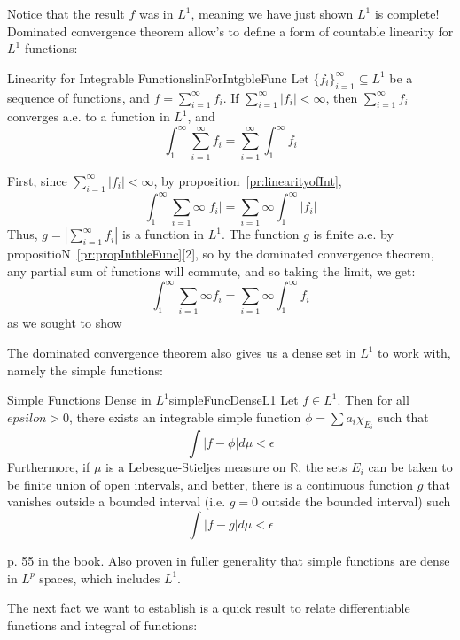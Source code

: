 \documentclass[oneside]{book}
\newcommand{\R}{\mathbb{R}}
\newcommand{\sse}{\subseteq}
\begin{document}
Notice that the result $f$ was in $L^1$, meaning we have just shown $L^1$ is complete!  Dominated convergence theorem
allow's to define a form of countable linearity for $L^1$ functions:

\begin{thm}{Linearity for Integrable Functions}{linForIntgbleFunc}
	Let $\{f_i\}_{i=1}^\infty \sse L^1$ be a sequence of functions, and $f = \sum_{i=1}^\infty f_i$. If
	$\sum_{i=1}^\infty |f_i| < \infty$, then $\sum_{i=1}^\infty f_i$ converges a.e. to a function in $L^1$, and
	\[
		\int_1^\infty \sum_{i=1}^\infty f_i = \sum_{i=1}^\infty \int_1^\infty  f_i
	\]
\end{thm}

\begin{Proof}
	First, since $\sum_{i=1}^\infty |f_i| < \infty$, by proposition~\ref{pr:linearityofInt}, 
	\[
		\int_1^\infty \sum_{i=1}\infty |f_i| = \sum_{i=1}\infty\int_1^\infty  |f_i|
	\]
	Thus, $g = \left|\sum_{i=1}^\infty f_i\right|$ is a function in $L^1$. The function $g$ is finite a.e. by
	propositioN~\ref{pr:propIntbleFunc}[2], so by the dominated convergence theorem, any partial sum of functions will
	commute, and so taking the limit, we get:
	\[
		\int_1^\infty \sum_{i=1}\infty f_i = \sum_{i=1}\infty\int_1^\infty  f_i
	\]
	as we sought to show
\end{Proof}

The dominated convergence theorem also gives us a dense set in $L^1$ to work with, namely the simple functions:

\begin{thm}{Simple Functions Dense in $L^1$}{simpleFuncDenseL1}
	Let $f \in L^1$. Then for all $epsilon > 0$, there exists an integrable simple function $\phi = \sum a_i \chi_{E_i}$
	such that
	\[
		\int |f - \phi|d\mu < \epsilon
	\]
	Furthermore, if $\mu$ is a Lebesgue-Stieljes measure on $\R$, the sets $E_i$ can be taken to be finite union of open
	intervals, and better, there is a continuous function $g$ that vanishes outside a bounded interval (i.e. $g = 0$
	outside the bounded interval) such 
	\[
		\int |f - g|d\mu < \epsilon
	\]
\end{thm}

\begin{Proof}
	p. 55 in the book. Also proven in fuller generality that simple functions are dense in $L^p$ spaces, which includes
	$L^1$.
\end{Proof}

The next fact we want to establish is a quick result to relate differentiable functions and integral of functions:
\end{document}
